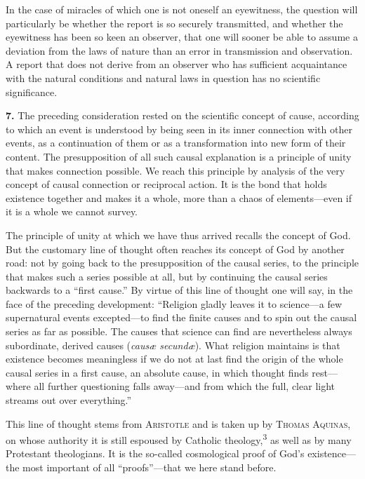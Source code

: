 \documentclass[12pt,a4paper]{book}
\newcommand{\opage}[1]{\marginnote{\footnotesize\textit{[#1]}}}
\begin{document}
In the case of miracles of which one is not oneself an eyewitness, the
question will particularly be whether the report is so securely
transmitted, and whether the eyewitness has been so keen an observer,
that one will sooner be able to assume a deviation from the laws of
nature than an error in transmission and observation. A report that does
not derive from an observer who has sufficient acquaintance with the
natural conditions and natural laws in question has no scientific
significance.

\medskip

\noindent\textbf{7.} The preceding consideration rested on the
scientific concept of cause, according to which an event is understood
by being seen in its inner connection with other events, as a
continuation of them or as a transformation into new form of their
content. The presupposition of all such causal explanation is a
principle of unity that makes connection possible. We reach this
principle by analysis of the very concept of causal connection or
reciprocal action. It is the bond that holds existence together and
makes it a whole, more than a chaos of elements---even if it is a whole
we cannot survey.

The principle of unity at which we have thus arrived recalls the concept
of God. But the customary line of thought often reaches its concept of
God by another road: not by going back to the 
\opage{22}presupposition of the
causal series, to the principle that makes such a series possible at
all, but by continuing the causal series backwards to a ``first cause.''
By virtue of this line of thought one will say, in the face of the
preceding development: ``Religion gladly leaves it to science---a few
supernatural events excepted---to find the finite causes and to spin out
the causal series as far as possible. The causes that science can find
are nevertheless always subordinate, derived causes (\textit{causæ
secundæ}). What religion maintains is that existence becomes meaningless
if we do not at last find the origin of the whole causal series in a
first cause, an absolute cause, in which thought finds rest---where all
further questioning falls away---and from which the full, clear light
streams out over everything.''

This line of thought stems from \textsc{Aristotle} and is taken up by
\textsc{Thomas Aquinas}, on whose authority it is still espoused by
Catholic theology,\textsuperscript{3} as well as by many Protestant
theologians. It is the so-called cosmological proof of God's
existence---the most important of all ``proofs''---that we here stand
before.
\end{document}
